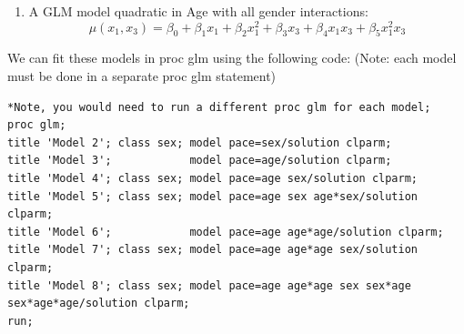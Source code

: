 \begin{enumerate}
\item A GLM model quadratic in Age with all gender interactions:
$$\mu(x_1,x_3) = \beta_0 + \beta_1 x_1+ \beta_2 x_1^2+ \beta_3 x_3 + \beta_4 x_1x_3 + \beta_5x_1^2x_3 $$
\end{enumerate}

\newpage

We can fit these models in proc glm using the following code: (Note: each model must be done in a separate proc glm statement)
\begin{small}
\begin{verbatim}
*Note, you would need to run a different proc glm for each model;
proc glm;  
title 'Model 2'; class sex; model pace=sex/solution clparm;
title 'Model 3';            model pace=age/solution clparm;
title 'Model 4'; class sex; model pace=age sex/solution clparm;
title 'Model 5'; class sex; model pace=age sex age*sex/solution clparm;
title 'Model 6';            model pace=age age*age/solution clparm;
title 'Model 7'; class sex; model pace=age age*age sex/solution clparm;
title 'Model 8'; class sex; model pace=age age*age sex sex*age sex*age*age/solution clparm;
run;
\end{verbatim}
\end{small}

